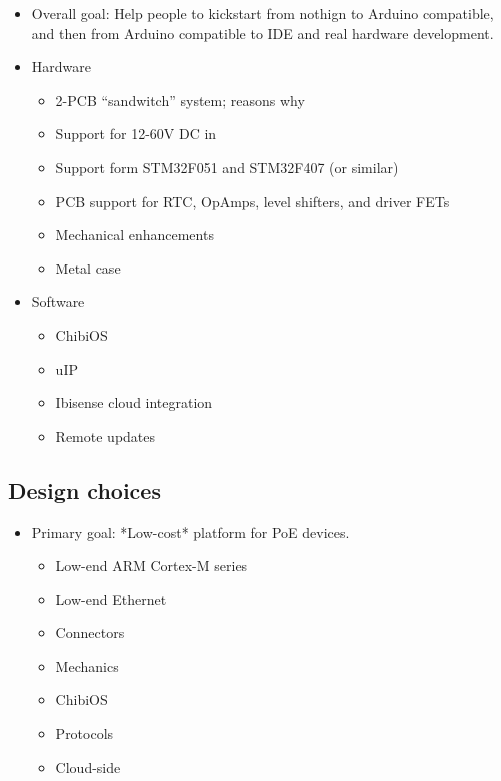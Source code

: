 \documentclass[draft,a4paper]{siamltex}
\begin{document}
\begin{itemize}
  \item Overall goal: Help people to kickstart from nothign to Arduino
    compatible, and then from Arduino compatible to IDE and real hardware
    development.
  \item Hardware
    \begin{itemize}
    \item 2-PCB ``sandwitch'' system; reasons why
    \item Support for 12-60V DC in
    \item Support form STM32F051 and STM32F407 (or similar)
    \item PCB support for RTC, OpAmps, level shifters, and driver FETs
    \item Mechanical enhancements
    \item Metal case
    \end{itemize}
  \item Software
    \begin{itemize}
    \item ChibiOS
    \item uIP
    \item Ibisense cloud integration
    \item Remote updates
    \end{itemize}
\end{itemize}

\subsection{Design choices}
 
\begin{itemize}
  \item Primary goal: *Low-cost* platform for PoE devices.
    \begin{itemize}
    \item Low-end ARM Cortex-M series
    \item Low-end Ethernet
    \item Connectors
    \item Mechanics
    \item ChibiOS
    \item Protocols
    \item Cloud-side
    \end{itemize}
\end{itemize}

\end{document}
